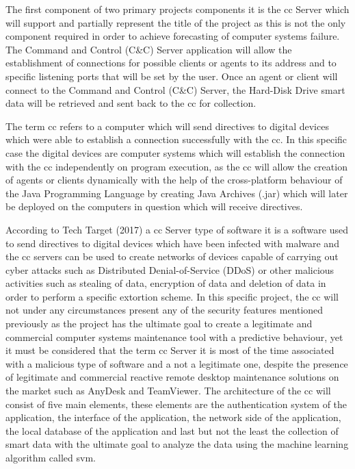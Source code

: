 The first component of two primary projects components it is the \acrfull{cc} Server which will
support and partially represent the title of the project as this is not the only component required
in order to achieve forecasting of computer systems failure.
The Command and Control (C\&C) Server application will allow the establishment of connections
for possible clients or agents to its address and to specific listening ports that will be set by the user.
Once an agent or client will connect to the Command and Control (C\&C) Server, the Hard-Disk Drive \acrfull{smart}
data will be retrieved and sent back to the \acrfull{cc} for collection. \par
The term \acrfull{cc} refers to a computer which will send directives to digital
devices which were able to establish a connection successfully with the \acrfull{cc}.
In this specific case the digital devices are computer systems which will establish the
connection with the \acrfull{cc} independently on program execution, as the \acrfull{cc}
will allow the creation of agents or clients dynamically with the help of the
cross-platform behaviour of the Java Programming Language by creating Java Archives (.jar)
which will later be deployed on the computers in question which will receive directives. \par
According to Tech Target (2017) a \acrfull{cc} Server type of software it is a software
used to send directives to digital devices which have been infected with malware and the \acrfull{cc}
servers can be used to create networks of devices capable of carrying out cyber attacks such as
Distributed Denial-of-Service (DDoS) or other malicious activities such as stealing of data,
encryption of data and deletion of data in order to perform a specific extortion scheme.
In this specific project, the \acrfull{cc} will not under any circumstances present any of the
security features mentioned previously as the project has the ultimate goal to create a
legitimate and commercial computer systems maintenance tool with a predictive behaviour, yet
it must be considered that the term \acrfull{cc} Server it is most of the time associated with
a malicious type of software and a not a legitimate one, despite the presence of legitimate
and commercial reactive remote desktop maintenance solutions on the market such as AnyDesk and TeamViewer.
The architecture of the \acrfull{cc} will consist of five main elements, these elements are the authentication
system of the application, the interface of the application, the network side of the application, the local
database of the application and last but not the least the collection of \acrfull{smart} data with the ultimate
goal to analyze the data using the machine learning algorithm called \acrfull{svm}.

